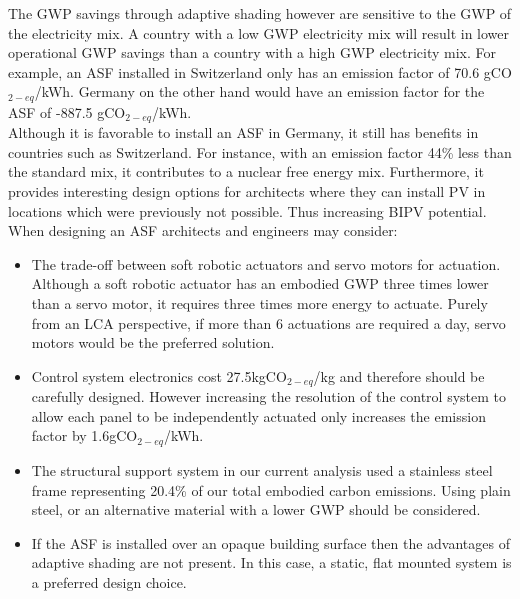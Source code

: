 The GWP savings through adaptive shading however are sensitive to the GWP of the electricity mix. A country with a low GWP electricity mix will result in lower operational GWP savings than a country with a high GWP electricity mix. For example, an ASF installed in Switzerland only has an emission factor of 70.6 gCO$_{2-eq}$/kWh. Germany on the other hand would have an emission factor for the ASF of -887.5  gCO$_{2-eq}$/kWh.\\

Although it is favorable to install an ASF in Germany, it still has benefits in countries such as Switzerland. For instance, with an emission factor 44\% less than the standard mix, it contributes to a nuclear free energy mix. Furthermore, it provides interesting design options for architects where they can install PV in locations which were previously not possible. Thus increasing BIPV potential.  \\

When designing an ASF architects and engineers may consider: 
\begin{itemize}
\item The trade-off between soft robotic actuators and servo motors for actuation. Although a soft robotic actuator has an embodied GWP three times lower than a servo motor, it requires three times more energy to actuate. Purely from an LCA perspective, if more than 6 actuations are required a day, servo motors would be the preferred solution. 
\item Control system electronics cost 27.5kgCO$_{2-eq}$/kg and therefore should be carefully designed. However increasing the resolution of the control system to allow each panel to be independently actuated only increases the emission factor by 1.6gCO$_{2-eq}$/kWh.
\item The structural support system in our current analysis used a stainless steel frame representing 20.4\% of our total embodied carbon emissions. Using plain steel, or an alternative material with a lower GWP should be considered.
\item If the ASF is installed over an opaque building surface then the advantages of adaptive shading are not present. In this case, a static, flat mounted system is a preferred design choice. 
\end{itemize}

